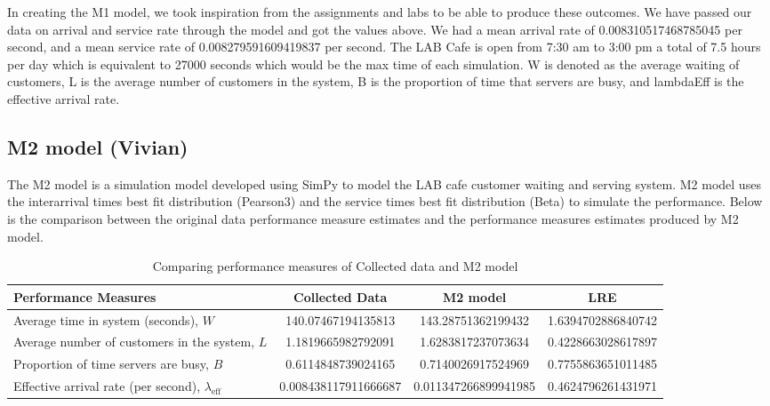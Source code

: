 \documentclass{article}
\begin{document}
In creating the M1 model, we took inspiration from the assignments and labs to be able to produce these outcomes. We have passed our data on arrival and service rate through the model and got the values above.
We had a mean arrival rate of 0.008310517468785045 per second, and a mean service rate of 0.008279591609419837 per second. The LAB Cafe is open from 7:30 am to 3:00 pm a total of 7.5 hours per day which is equivalent to 27000 seconds which would be the max time of each simulation. 
W is denoted as the average waiting of customers, L is the average number of customers in the system, B is the proportion of time that servers are busy, and lambdaEff is the effective arrival rate.

\subsection{M2 model (Vivian)}

The M2 model is a simulation model developed using SimPy to model the LAB cafe customer waiting and serving system. M2 model uses the interarrival times best fit distribution (Pearson3) and the service times best fit distribution (Beta) to simulate the performance. Below is the comparison between the original data performance measure estimates and the performance measures estimates produced by M2 model.

\begin{table}[H]
    \centering
    \caption{Comparing performance measures of Collected data and M2 model}
    \begin{tabu}{X S S S}
        \toprule
        \textbf{Performance Measures} & \textbf{Collected Data} & \textbf{M2 model}& \textbf{LRE}\\
        \midrule
        Average time in system (seconds), $W$ & 140.07467194135813 & 143.28751362199432 & 1.6394702886840742\\
        Average number of customers in the system, $L$ & 1.1819665982792091 & 1.6283817237073634 & 0.4228663028617897\\
        Proportion of time servers are busy, $B$ & 0.6114848739024165 & 0.7140026917524969 & 0.7755863651011485\\
        Effective arrival rate (per second), $\lambda_{\text{eff}}$ & 0.008438117911666687 & 0.011347266899941985 & 0.4624796261431971\\
        \bottomrule
    \end{tabu}
    \label{tab:M2}
\end{table}
\end{document}
